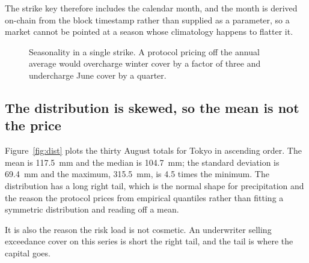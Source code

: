 \documentclass[11pt,a4paper]{article}
\begin{document}
The strike key therefore includes the calendar month, and the month is derived on-chain from
the block timestamp rather than supplied as a parameter, so a market cannot be pointed at a
season whose climatology happens to flatter it.

\begin{figure}[h]
\centering
{}
\caption{Seasonality in a single strike. A protocol pricing off the annual average would
overcharge winter cover by a factor of three and undercharge June cover by a quarter.}
\label{fig:seasonal}
\end{figure}

\subsection{The distribution is skewed, so the mean is not the price}

Figure~\ref{fig:dist} plots the thirty August totals for Tokyo in ascending order. The mean
is 117.5~mm and the median is 104.7~mm; the standard deviation is 69.4~mm and the maximum,
315.5~mm, is 4.5 times the minimum. The distribution has a long right tail, which is the
normal shape for precipitation and the reason the protocol prices from empirical quantiles
rather than fitting a symmetric distribution and reading off a mean.

It is also the reason the risk load is not cosmetic. An underwriter selling exceedance cover
on this series is short the right tail, and the tail is where the capital goes.
\end{document}
